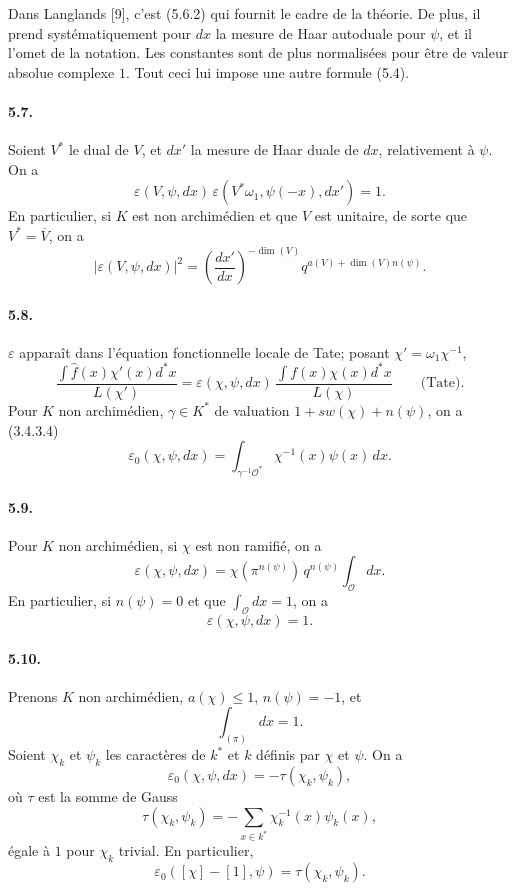 \documentclass[10pt,letterpaper]{article}
\begin{document}
Dans Langlands [9], c'est (5.6.2) qui fournit le cadre de la théorie. De plus, il prend systématiquement pour \(dx\) la mesure de Haar autoduale pour \(\psi\), et il l'omet de la notation. Les constantes sont de plus normalisées pour être de valeur absolue complexe \(1\). Tout ceci lui impose une autre formule (5.4).

\paragraph{5.7.} Soient \(V^*\) le dual de \(V\), et \(dx'\) la mesure de Haar duale de \(dx\), relativement à \(\psi\). On a
\[
\tag{5.7.1}
\varepsilon(V,\psi,dx)\,
\varepsilon(V^*\omega_1,\psi(-x),dx')=1.
\]
En particulier, si \(K\) est non archimédien et que \(V\) est unitaire, de sorte que \(V^*=\overline V\), on a
\[
\tag{5.7.2}
|\varepsilon(V,\psi,dx)|^2
=
\left(\frac{dx'}{dx}\right)^{-\dim(V)}
q^{a(V)+\dim(V)n(\psi)}.
\]

\paragraph{5.8.} \(\varepsilon\) apparaît dans l'équation fonctionnelle locale de Tate; posant \(\chi'=\omega_1\chi^{-1}\),
\[
\tag{5.8.1}
\frac{\displaystyle\int \widehat f(x)\chi'(x)d^*x}{L(\chi')}
=
\varepsilon(\chi,\psi,dx)\,
\frac{\displaystyle\int f(x)\chi(x)d^*x}{L(\chi)}
\qquad\text{(Tate).}
\]
Pour \(K\) non archimédien, \(\gamma\in K^*\) de valuation \(1+sw(\chi)+n(\psi)\), on a (3.4.3.4)
\[
\tag{5.8.2}
\varepsilon_0(\chi,\psi,dx)
=
\int_{\gamma^{-1}\mathcal O^*}\chi^{-1}(x)\psi(x)\,dx.
\]

\paragraph{5.9.} Pour \(K\) non archimédien, si \(\chi\) est non ramifié, on a
\[
\varepsilon(\chi,\psi,dx)
=
\chi(\pi^{n(\psi)})\,q^{n(\psi)}
\int_{\mathcal O}dx.
\]
En particulier, si \(n(\psi)=0\) et que \(\int_{\mathcal O}dx=1\), on a
\[
\varepsilon(\chi,\psi,dx)=1.
\]

\paragraph{5.10.} Prenons \(K\) non archimédien, \(a(\chi)\le1\), \(n(\psi)=-1\), et
\[
\int_{(\pi)}dx=1.
\]
Soient \(\chi_k\) et \(\psi_k\) les caractères de \(k^*\) et \(k\) définis par \(\chi\) et \(\psi\). On a
\[
\tag{5.10.1}
\varepsilon_0(\chi,\psi,dx)=-\tau(\chi_k,\psi_k),
\]
où \(\tau\) est la somme de Gauss
\[
\tag{5.10.2}
\tau(\chi_k,\psi_k)
=
-\sum_{x\in k^*}\chi_k^{-1}(x)\psi_k(x),
\]
égale à \(1\) pour \(\chi_k\) trivial. En particulier,
\[
\tag{5.10.3}
\varepsilon_0([\chi]-[1],\psi)=\tau(\chi_k,\psi_k).
\]
\end{document}
